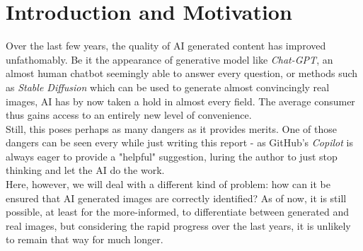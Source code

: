 \chapter{Introduction and Motivation}
\label{ch:intro}

Over the last few years, the quality of AI generated content has improved unfathomably.
Be it the appearance of generative model like \textit{Chat-GPT}, an almost human chatbot seemingly able to answer every question,
or methods such as \textit{Stable Diffusion} which can be used to generate almost convincingly real images, 
AI has by now taken a hold in almost every field. 
The average consumer thus gains access to an entirely new level of convenience. \\

Still, this poses perhaps as many dangers as it provides merits.
One of those dangers can be seen every while just writing this report - as GitHub's \textit{Copilot} is always eager to provide a "helpful" suggestion,
luring the author to just stop thinking and let the AI do the work. \\

Here, however, we will deal with a different kind of problem: how can it be ensured that AI generated images are correctly identified?
As of now, it is still possible, at least for the more-informed, to differentiate between generated and real images, but considering the rapid progress over the last years,
it is unlikely to remain that way for much longer. \\ %






